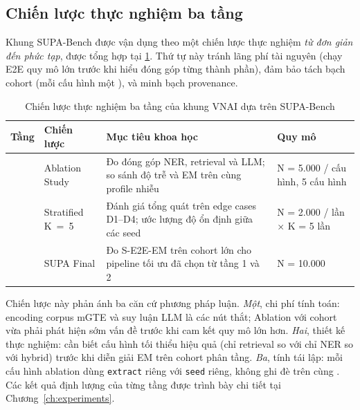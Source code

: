 \subsection{Chiến lược thực nghiệm ba tầng}
\label{sec:supa-strategy}

Khung SUPA-Bench được vận dụng theo một chiến lược thực nghiệm \emph{từ đơn giản đến phức tạp}, được tổng hợp tại \cref{tab:supa-strategy}. Thứ tự này tránh lãng phí tài nguyên (chạy E2E quy mô lớn trước khi hiểu đóng góp từng thành phần), đảm bảo tách bạch cohort (mỗi cấu hình một ), và minh bạch provenance.

\begin{table}[H]
\centering
\caption{Chiến lược thực nghiệm ba tầng của khung VNAI dựa trên SUPA-Bench}
\label{tab:supa-strategy}
\small
\begin{tabularx}{\linewidth}{>{\raggedright\arraybackslash}p{1.0cm} >{\raggedright\arraybackslash}p{2.8cm} >{\raggedright\arraybackslash}X >{\raggedright\arraybackslash}p{2.6cm}}
\toprule
\textbf{Tầng} & \textbf{Chiến lược} & \textbf{Mục tiêu khoa học} & \textbf{Quy mô} \\
\midrule
1 & Ablation Study     & Đo đóng góp NER, retrieval và LLM; so sánh độ trễ và EM trên cùng profile nhiễu & N = 5.000 / cấu hình, 5 cấu hình \\
2 & Stratified K~=~5   & Đánh giá tổng quát trên edge cases D1--D4; ước lượng độ ổn định giữa các seed & N = 2.000 / lần × K = 5 lần \\
3 & SUPA Final         & Đo S-E2E-EM trên cohort lớn cho pipeline tối ưu đã chọn từ tầng 1 và 2 & N = 10.000 \\
\bottomrule
\end{tabularx}
\end{table}

Chiến lược này phản ánh ba căn cứ phương pháp luận. \emph{Một}, chi phí tính toán: encoding corpus mGTE và suy luận LLM là các nút thắt; Ablation với cohort vừa phải phát hiện sớm vấn đề trước khi cam kết quy mô lớn hơn. \emph{Hai}, thiết kế thực nghiệm: cần biết cấu hình tối thiểu hiệu quả (chỉ retrieval so với chỉ NER so với hybrid) trước khi diễn giải EM trên cohort phân tầng. \emph{Ba}, tính tái lập: mỗi cấu hình ablation dùng \texttt{extract} riêng với \texttt{seed} riêng, không ghi đè  trên cùng . Các kết quả định lượng của từng tầng được trình bày chi tiết tại Chương~\ref{ch:experiments}.

